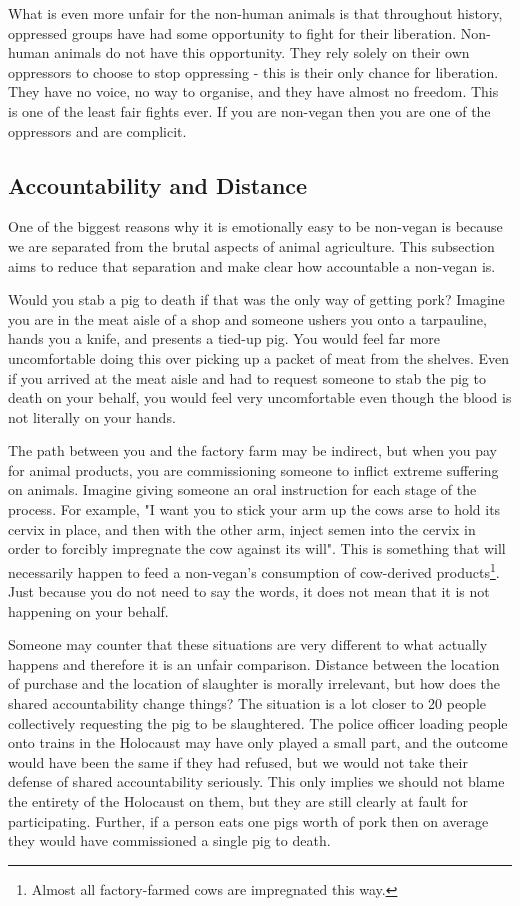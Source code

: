 What is even more unfair for the non-human animals is that throughout history, oppressed groups have had some opportunity to fight for their liberation. Non-human animals do not have this opportunity. They rely solely on their own oppressors to choose to stop oppressing - this is their only chance for liberation. They have no voice, no way to organise, and they have almost no freedom. This is one of the least fair fights ever. If you are non-vegan then you are one of the oppressors and are complicit.

\subsection{Accountability and Distance}

One of the biggest reasons why it is emotionally easy to be non-vegan is because we are separated from the brutal aspects of animal agriculture. This subsection aims to reduce that separation and make clear how accountable a non-vegan is.

Would you stab a pig to death if that was the only way of getting pork? Imagine you are in the meat aisle of a shop and someone ushers you onto a tarpauline, hands you a knife, and presents a tied-up pig. You would feel far more uncomfortable doing this over picking up a packet of meat from the shelves. Even if you arrived at the meat aisle and had to request someone to stab the pig to death on your behalf, you would feel very uncomfortable even though the blood is not literally on your hands.

The path between you and the factory farm may be indirect, but when you pay for animal products, you are commissioning someone to inflict extreme suffering on animals. Imagine giving someone an oral instruction for each stage of the process. For example, "I want you to stick your arm up the cows arse to hold its cervix in place, and then with the other arm, inject semen into the cervix in order to forcibly impregnate the cow against its will". This is something that will necessarily happen to feed a non-vegan's consumption of cow-derived products\footnote{Almost all factory-farmed cows are impregnated this way.}. Just because you do not need to say the words, it does not mean that it is not happening on your behalf.

Someone may counter that these situations are very different to what actually happens and therefore it is an unfair comparison. Distance between the location of purchase and the location of slaughter is morally irrelevant, but how does the shared accountability change things? The situation is a lot closer to 20 people collectively requesting the pig to be slaughtered. The police officer loading people onto trains in the Holocaust may have only played a small part, and the outcome would have been the same if they had refused, but we would not take their defense of shared accountability seriously. This only implies we should not blame the entirety of the Holocaust on them, but they are still clearly at fault for participating. Further, if a person eats one pigs worth of pork then on average they would have commissioned a single pig to death.
